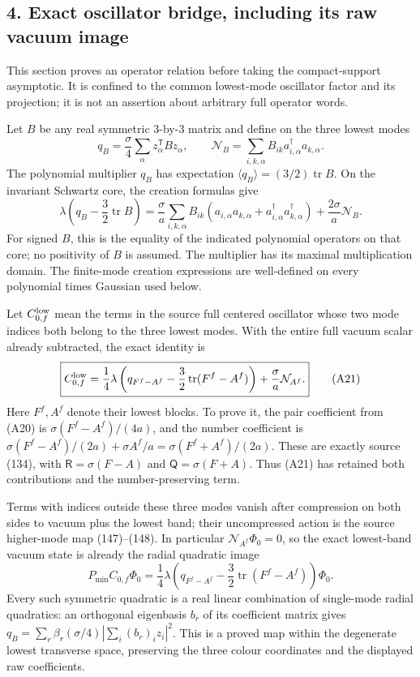 \documentclass[
  11pt,
]{article}
\begin{document}
\subsection{4. Exact oscillator bridge, including its raw vacuum
image}\label{weak-coupling-part-10-exact-oscillator-bridge-including-its-raw-vacuum-image}

This section proves an operator relation before taking the
compact-support asymptotic. It is confined to the common lowest-mode
oscillator factor and its projection; it is not an assertion about
arbitrary full operator words.

Let \(B\) be any real symmetric \(3\)-by-\(3\) matrix and define on the
three lowest modes \[
 q_B=\frac\sigma4\sum_\alpha z_\alpha^{\mathsf T}Bz_\alpha,
 \qquad \mathcal N_B=\sum_{i,k,\alpha}B_{ik}
                         a_{i,\alpha}^\dagger a_{k,\alpha}.
\] The polynomial multiplier \(q_B\) has expectation
\(\langle q_B\rangle=(3/2)\operatorname{tr}B\). On the invariant
Schwartz core, the creation formulas give \[
 \lambda\left(q_B-\frac32\operatorname{tr}B\right)
 =\frac\sigma a\sum_{i,k,\alpha}B_{ik}
       (a_{i,\alpha}a_{k,\alpha}
          +a_{i,\alpha}^\dagger a_{k,\alpha}^\dagger)
   +\frac{2\sigma}a\mathcal N_B.
\tag{A20}
\] For signed \(B\), this is the equality of the indicated polynomial
operators on that core; no positivity of \(B\) is assumed. The
multiplier has its maximal multiplication domain. The finite-mode
creation expressions are well-defined on every polynomial times Gaussian
used below.

Let \(C^{\rm low}_{0,f}\) mean the terms in the source full centered
oscillator whose two mode indices both belong to the three lowest modes.
With the entire full vacuum scalar already subtracted, the exact
identity is \[
 \boxed{
 C^{\rm low}_{0,f}
 =\frac14\lambda\left(q_{F^f-A^f}
                 -\frac32\operatorname{tr}(F^f-A^f)\right)
       +\frac\sigma a\mathcal N_{A^f}.}
\tag{A21}
\] Here \(F^f,A^f\) denote their lowest blocks. To prove it, the pair
coefficient from (A20) is \(\sigma(F^f-A^f)/(4a)\), and the number
coefficient is \(\sigma(F^f-A^f)/(2a)+\sigma A^f/a
 =\sigma(F^f+A^f)/(2a)\). These are exactly source (134), with
\(\mathsf R=\sigma(F-A)\) and \(\mathsf Q=\sigma(F+A)\). Thus (A21) has
retained both contributions and the number-preserving term.

Terms with indices outside these three modes vanish after compression on
both sides to vacuum plus the lowest band; their uncompressed action is
the source higher-mode map (147)--(148). In particular
\(\mathcal N_{A^f}\Phi_0=0\), so the exact lowest-band vacuum state is
already the radial quadratic image \[
 P_{\min}C_{0,f}\Phi_0
 =\frac14\lambda\left(q_{F^f-A^f}
             -\frac32\operatorname{tr}(F^f-A^f)\right)\Phi_0.
\tag{A22}
\] Every such symmetric quadratic is a real linear combination of
single-mode radial quadratics: an orthogonal eigenbasis \(b_r\) of its
coefficient matrix gives
\(q_B=\sum_r\beta_r(\sigma/4)|\sum_i(b_r)_iz_i|^2\). This is a proved
map within the degenerate lowest transverse space, preserving the three
colour coordinates and the displayed raw coefficients.
\end{document}
